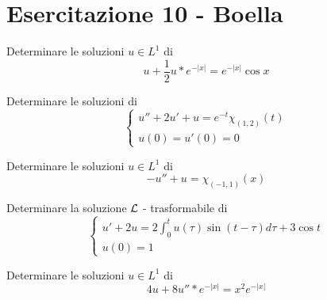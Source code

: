 \chapter{Esercitazione 10 - Boella}
\ParteEsercizi
\Esercizio{}

Determinare le soluzioni $u\in L^{1}$ di
\begin{equation*}
u + \frac{1}{2} u*e^{- | x|} = e^{- | x|}\cos x
\end{equation*}
\Esercizio{}

Determinare le soluzioni di
\begin{equation*}
\begin{cases}
u'' + 2u' + u = e^{- t} \chi_{(1, 2)}(t)\\
u(0) = u'(0) = 0
\end{cases}
\end{equation*}
\Esercizio{}

Determinare le soluzioni $u\in L^{1}$ di
\begin{equation*}
- u'' + u = \chi_{(- 1, 1)}(x)
\end{equation*}
\Esercizio{}

Determinare la soluzione $\mathcal{L}$ - trasformabile di
\begin{equation*}
\begin{cases}
u' + 2u = 2\int^{t}_{0} u(\tau)\sin(t - \tau) d\tau + 3\cos t\\
u(0) = 1
\end{cases}
\end{equation*}
\Esercizio{}

Determinare le soluzioni $u\in L^{1}$ di
\begin{equation*}
4u + 8u''*e^{- | x|} = x^{2} e^{- | x|}
\end{equation*}
\Esercizio{}

